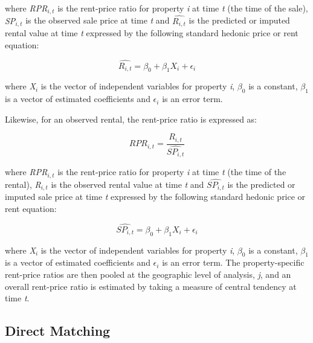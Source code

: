 \documentclass{article}\usepackage[]{graphicx}\usepackage[]{color}
\begin{document}
where \textit{RPR$_{i,t}$} is the rent-price ratio for property \textit{i} at time \textit{t} (the time of the sale), \textit{SP$_{i,t}$} is the observed sale price at time \textit{t} and $\widehat{R_{i, t}}$ is the predicted or imputed rental value at time \textit{t} expressed by the following standard hedonic price or rent equation:
   
\begin{equation}
  \widehat{R_{i,t}} = \beta_{0} + \beta_{1} X_{i} + \epsilon _{i} 
\end{equation}  
  
where \textit{X$_{i}$} is the vector of independent variables for property \textit{i}, \textit{$\beta_{0}$} is a constant, \textit{$\beta_{1}$} is a vector of estimated coefficients and \textit{$\epsilon _{i}$} is an error term.\par
  
Likewise, for an observed rental, the rent-price ratio is expressed as:\par
 
\begin{equation}
 RPR_{i,t} = \frac{R_{i,t}
   }{
   \widehat{SP_{i,t}}
   }
\end{equation}

where \textit{RPR$_{i,t}$} is the rent-price ratio for property \textit{i} at time \textit{t} (the time of the rental), \textit{R$_{i,t}$} is the observed rental value at time \textit{t} and \textit{$\widehat{SP_{i, t}}$} is the predicted or imputed sale price at time \textit{t} expressed by the following standard hedonic price or rent equation:

\begin{equation}
\widehat{SP_{i,t}} = \beta_{0} + \beta_{1} X_{i} + \epsilon {_i}
\end{equation}

where \textit{X$_{i}$} is the vector of independent variables for property \textit{i}, \textit{$\beta_{0}$} is a constant, \textit{$\beta_{1}$} is a vector of estimated coefficients and \textit{$\epsilon_{i}$} is an error term. The property-specific rent-price ratios are then pooled at the geographic level of analysis, \textit{j}, and an overall rent-price ratio is estimated by taking a measure of central tendency at time \textit{t}.

 
\subsection*{Direct Matching}
 
\end{document}
